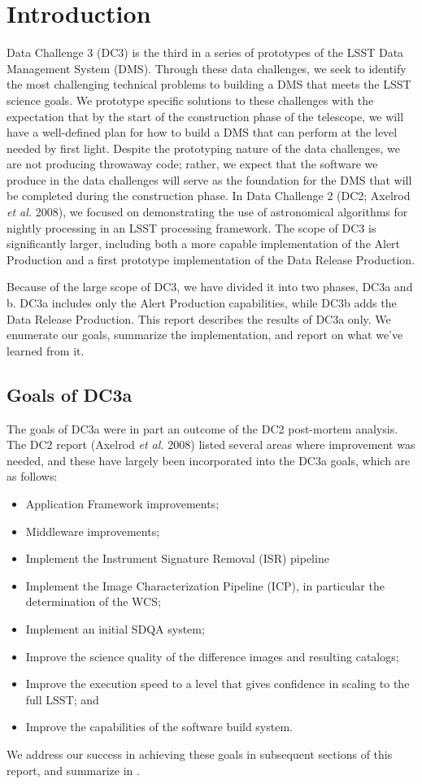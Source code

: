 
\section{Introduction}

Data Challenge 3 (DC3) is the third in a series of prototypes of the
LSST Data Management System (DMS). Through these data challenges, we
seek to identify the most challenging technical problems to building a
DMS that meets the LSST science goals. We prototype specific solutions
to these challenges with the expectation that by the start of the
construction phase of the telescope, we will have a well-defined plan
for how to build a DMS that can perform at the level needed by first
light. Despite the prototyping nature of the data challenges, we are
not producing throwaway code; rather, we expect that the software we
produce in the data challenges will serve as the foundation for the
DMS that will be completed during the construction phase.  In Data
Challenge 2 (DC2; Axelrod {\it et al.} 2008), we focused on
demonstrating the use of astronomical algorithms for nightly
processing in an LSST processing framework.  The scope of DC3 is
significantly larger, including both a more capable implementation of
the Alert Production and a first prototype implementation of the Data
Release Production.

Because of the large scope of DC3, we have divided it into two phases,
DC3a and b.  DC3a includes only the Alert Production capabilities,
while DC3b adds the Data Release Production.  This report describes
the results of DC3a only. We enumerate our goals, summarize the
implementation, and report on what we've learned from it.

\subsection{Goals of DC3a}

The goals of DC3a were in part an outcome of the DC2 post-mortem
analysis.  The DC2 report (Axelrod {\it et al.} 2008) listed several
areas where improvement was needed, and these have largely been
incorporated into the DC3a goals, which are as follows:

\begin{itemize}
\item Application Framework improvements;
\item Middleware improvements;
\item Implement the Instrument Signature Removal (ISR) pipeline
\item Implement the Image Characterization Pipeline (ICP), in
  particular the determination of the WCS;
\item Implement an initial SDQA system;
\item Improve the science quality of the difference images and
  resulting catalogs;
\item Improve the execution speed to a level that gives confidence in
  scaling to the full LSST; and
\item Improve the capabilities of the software build system.
\end{itemize}

We address our success in achieving these goals in subsequent sections
of this report, and summarize in .
